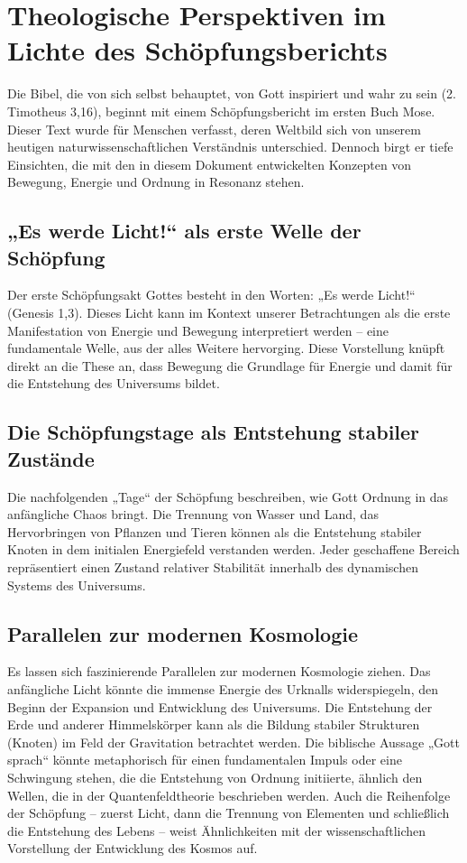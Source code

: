 \documentclass{article}
\begin{document}
	\section{Theologische Perspektiven im Lichte des Schöpfungsberichts}
	
	Die Bibel, die von sich selbst behauptet, von Gott inspiriert und wahr zu sein (2. Timotheus 3,16), beginnt mit einem Schöpfungsbericht im ersten Buch Mose. Dieser Text wurde für Menschen verfasst, deren Weltbild sich von unserem heutigen naturwissenschaftlichen Verständnis unterschied. Dennoch birgt er tiefe Einsichten, die mit den in diesem Dokument entwickelten Konzepten von Bewegung, Energie und Ordnung in Resonanz stehen.
	
	\subsection*{„Es werde Licht!“ als erste Welle der Schöpfung}
	Der erste Schöpfungsakt Gottes besteht in den Worten: „Es werde Licht!“ (Genesis 1,3). Dieses Licht kann im Kontext unserer Betrachtungen als die erste Manifestation von Energie und Bewegung interpretiert werden – eine fundamentale Welle, aus der alles Weitere hervorging. Diese Vorstellung knüpft direkt an die These an, dass Bewegung die Grundlage für Energie und damit für die Entstehung des Universums bildet.
	
	\subsection*{Die Schöpfungstage als Entstehung stabiler Zustände}
	Die nachfolgenden „Tage“ der Schöpfung beschreiben, wie Gott Ordnung in das anfängliche Chaos bringt. Die Trennung von Wasser und Land, das Hervorbringen von Pflanzen und Tieren können als die Entstehung stabiler Knoten in dem initialen Energiefeld verstanden werden. Jeder geschaffene Bereich repräsentiert einen Zustand relativer Stabilität innerhalb des dynamischen Systems des Universums.
	
	\subsection*{Parallelen zur modernen Kosmologie}
	Es lassen sich faszinierende Parallelen zur modernen Kosmologie ziehen. Das anfängliche Licht könnte die immense Energie des Urknalls widerspiegeln, den Beginn der Expansion und Entwicklung des Universums. Die Entstehung der Erde und anderer Himmelskörper kann als die Bildung stabiler Strukturen (Knoten) im Feld der Gravitation betrachtet werden. Die biblische Aussage „Gott sprach“ könnte metaphorisch für einen fundamentalen Impuls oder eine Schwingung stehen, die die Entstehung von Ordnung initiierte, ähnlich den Wellen, die in der Quantenfeldtheorie beschrieben werden. Auch die Reihenfolge der Schöpfung – zuerst Licht, dann die Trennung von Elementen und schließlich die Entstehung des Lebens – weist Ähnlichkeiten mit der wissenschaftlichen Vorstellung der Entwicklung des Kosmos auf.
	
\end{document}
